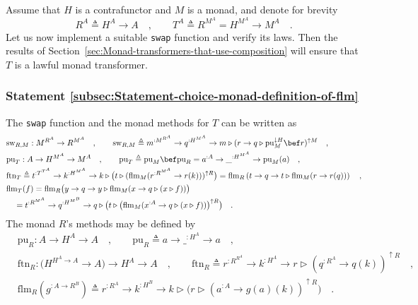 Assume that $H$ is a contrafunctor and $M$ is a monad, and denote
for brevity 
\[
R^{A}\triangleq H^{A}\rightarrow A\quad,\quad\quad T^{A}\triangleq R^{M^{A}}=H^{M^{A}}\rightarrow M^{A}\quad.
\]
Let us now implement a suitable \lstinline!swap! function and verify
its laws. Then the results of Section~\ref{sec:Monad-transformers-that-use-composition}
will ensure that $T$ is a lawful monad transformer. 

\subsubsection{Statement \label{subsec:Statement-choice-monad-definition-of-flm}\ref{subsec:Statement-choice-monad-definition-of-flm}}

The \lstinline!swap! function and the monad methods for $T$ can
be written as
\begin{align}
 & \text{sw}_{R,M}:M^{R^{A}}\rightarrow R^{M^{A}}\quad,\quad\quad\text{sw}_{R,M}\triangleq m^{:M^{R^{A}}}\rightarrow q^{:H^{M^{A}}}\rightarrow m\triangleright(r\rightarrow q\triangleright\text{pu}_{M}^{\downarrow H}\bef r)^{\uparrow M}\quad,\label{eq:rigid-monad-short-formula-for-swap}\\
 & \text{pu}_{T}:A\rightarrow H^{M^{A}}\rightarrow M^{A}\quad,\quad\quad\text{pu}_{T}\triangleq\text{pu}_{M}\bef\text{pu}_{R}=a^{:A}\rightarrow\_^{:H^{M^{A}}}\rightarrow\text{pu}_{M}(a)\quad,\nonumber \\
 & \text{ftn}_{T}\triangleq t^{:T^{T^{A}}}\rightarrow k^{:H^{M^{A}}}\rightarrow k\triangleright\big(t\triangleright(\text{flm}_{M}(r^{:R^{M^{A}}}\rightarrow r(k)))^{\uparrow R}\big)=\text{flm}_{R}\left(t\rightarrow q\rightarrow t\triangleright\text{flm}_{M}(r\rightarrow r(q))\right)\quad,\nonumber \\
 & \text{flm}_{T}(f)=\text{flm}_{R}\big(y\rightarrow q\rightarrow y\triangleright\text{flm}_{M}(x\rightarrow q\triangleright(x\triangleright f))\big)\label{eq:rigid-monad-def-flm-t-via-flm-r}\\
 & \quad=t^{:R^{M^{A}}}\rightarrow q^{:H^{M^{B}}}\rightarrow q\triangleright\big(t\triangleright\big(\text{flm}_{M}(x^{:A}\rightarrow q\triangleright(x\triangleright f))\big)^{\uparrow R}\big)\quad.\label{eq:rigid-monad-flm-T-def}
\end{align}
The monad $R$\textsf{'}s methods may be defined by
\begin{align}
 & \text{pu}_{R}:A\rightarrow H^{A}\rightarrow A\quad,\quad\quad\text{pu}_{R}\triangleq a\rightarrow\_^{:H^{A}}\rightarrow a\quad,\nonumber \\
 & \text{ftn}_{R}:(H^{H^{A}\rightarrow A}\rightarrow A\big)\rightarrow H^{A}\rightarrow A\quad,\quad\quad\text{ftn}_{R}\triangleq r^{:R^{R^{A}}}\rightarrow k^{:H^{A}}\rightarrow r\triangleright(q^{:R^{A}}\rightarrow q(k))^{\uparrow R}\quad,\nonumber \\
 & \text{flm}_{R}(g^{:A\rightarrow R^{B}})\triangleq r^{:R^{A}}\rightarrow k^{:H^{B}}\rightarrow k\triangleright\big(r\triangleright(a^{:A}\rightarrow g(a)(k))^{\uparrow R}\big)\quad.\label{eq:rigid-monad-flm-R-def}
\end{align}


